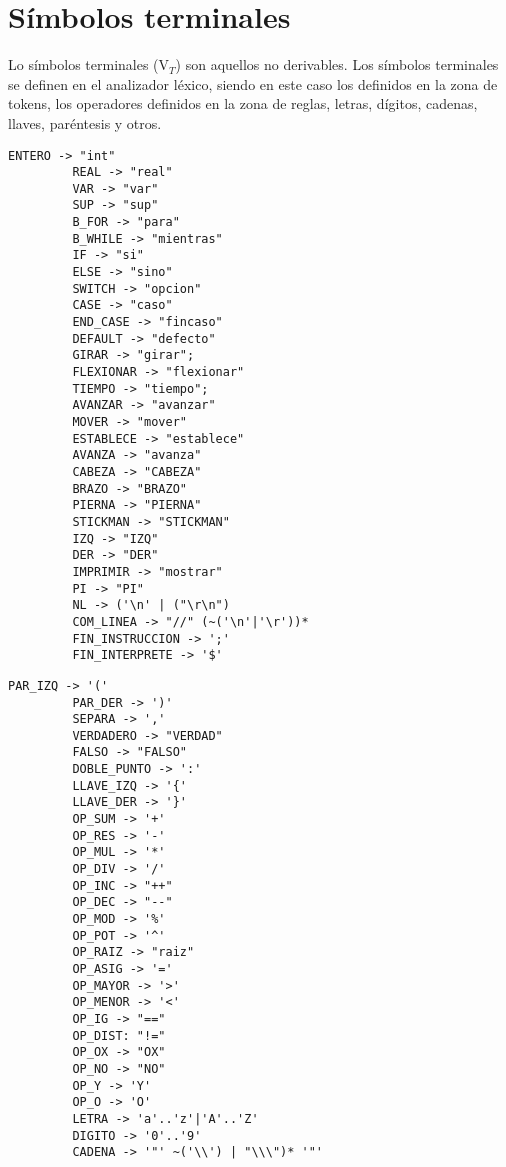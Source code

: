    \section{Símbolos terminales}
   Lo símbolos terminales (V$_{T}$) son aquellos no derivables. Los símbolos terminales se definen en el analizador léxico, siendo en este
   caso los definidos en la zona de tokens, los operadores definidos en la zona de reglas, letras, dígitos, cadenas, llaves, paréntesis y otros.\\
      \begin{minipage}{0.5\textwidth}
         \begin{lstlisting}[mathescape=false]
         ENTERO -> "int"
         REAL -> "real"
         VAR -> "var"
         SUP -> "sup"
         B_FOR -> "para"
         B_WHILE -> "mientras"
         IF -> "si"
         ELSE -> "sino"
         SWITCH -> "opcion"
         CASE -> "caso"
         END_CASE -> "fincaso"
         DEFAULT -> "defecto"
         GIRAR -> "girar";
         FLEXIONAR -> "flexionar"
         TIEMPO -> "tiempo";
         AVANZAR -> "avanzar"
         MOVER -> "mover"
         ESTABLECE -> "establece"
         AVANZA -> "avanza"
         CABEZA -> "CABEZA"
         BRAZO -> "BRAZO"
         PIERNA -> "PIERNA"
         STICKMAN -> "STICKMAN"
         IZQ -> "IZQ"
         DER -> "DER"
         IMPRIMIR -> "mostrar"
         PI -> "PI"
         NL -> ('\n' | ("\r\n")
         COM_LINEA -> "//" (~('\n'|'\r'))*
         FIN_INSTRUCCION -> ';'
         FIN_INTERPRETE -> '$'
         \end{lstlisting} 
      \end{minipage}\hfill
      \begin{minipage}{0.4\textwidth}
         \begin{lstlisting}[firstnumber=31]
         PAR_IZQ -> '('
         PAR_DER -> ')'
         SEPARA -> ','
         VERDADERO -> "VERDAD"
         FALSO -> "FALSO"
         DOBLE_PUNTO -> ':'
         LLAVE_IZQ -> '{'
         LLAVE_DER -> '}'
         OP_SUM -> '+'
         OP_RES -> '-'
         OP_MUL -> '*'
         OP_DIV -> '/'
         OP_INC -> "++"
         OP_DEC -> "--"
         OP_MOD -> '%'
         OP_POT -> '^'
         OP_RAIZ -> "raiz"
         OP_ASIG -> '='
         OP_MAYOR -> '>'
         OP_MENOR -> '<'
         OP_IG -> "=="
         OP_DIST: "!="
         OP_OX -> "OX"
         OP_NO -> "NO" 
         OP_Y -> 'Y'
         OP_O -> 'O'
         LETRA -> 'a'..'z'|'A'..'Z'
         DIGITO -> '0'..'9'  
         CADENA -> '"' ~('\\') | "\\\")* '"'
         \end{lstlisting} %
      \end{minipage}


